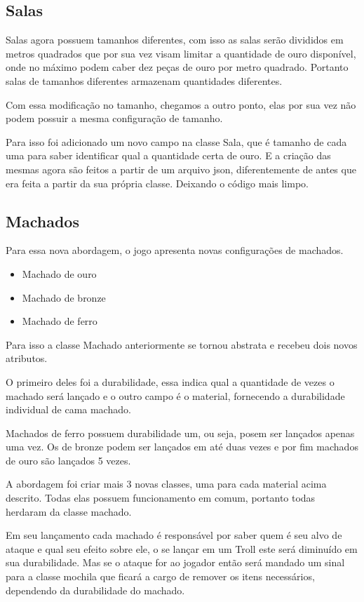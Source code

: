 \documentclass[runningheads,a4paper]{llncs}
\begin{document}
	\subsection{Salas}
		Salas agora possuem tamanhos diferentes, com isso as salas serão divididos em metros quadrados que por sua vez visam limitar a quantidade de ouro disponível, onde no máximo podem caber dez peças de ouro por metro quadrado. Portanto salas de tamanhos diferentes armazenam quantidades diferentes.
		
		Com essa modificação no tamanho, chegamos a outro ponto, elas por sua vez não podem possuir a mesma configuração de tamanho.
		
		Para isso foi adicionado um novo campo na classe Sala, que é tamanho de cada uma para saber identificar qual a quantidade certa de ouro. E a criação das mesmas agora são feitos a partir de um arquivo json, diferentemente de antes que era feita a partir da sua própria classe. Deixando o código mais limpo.
		
	
	\subsection{Machados}
		Para essa nova abordagem, o jogo apresenta novas configurações de machados.
		\begin{itemize}
			\item Machado de ouro
			\item Machado de bronze
			\item Machado de ferro
		\end{itemize}
		
		Para isso a classe Machado anteriormente se tornou abstrata e recebeu dois novos atributos. 
		
		O primeiro deles foi a durabilidade, essa indica qual a quantidade de vezes o machado será lançado e o outro campo é o material, fornecendo a durabilidade individual de cama machado.
		
		Machados de ferro possuem durabilidade um, ou seja, posem ser lançados apenas uma vez. Os de bronze podem ser lançados em até duas vezes e por fim machados de ouro são lançados 5 vezes.
		
		A abordagem foi criar mais 3 novas classes, uma para cada material acima descrito. Todas elas possuem funcionamento em comum, portanto todas herdaram da classe machado.
		
		Em seu lançamento cada machado é responsável por saber quem é seu alvo de ataque e qual seu efeito sobre ele, o se lançar em um Troll este será diminuído em sua durabilidade. Mas se o ataque for ao jogador então será mandado um sinal para a classe mochila que ficará a cargo de remover os itens necessários, dependendo da durabilidade do machado.
		
\end{document}
